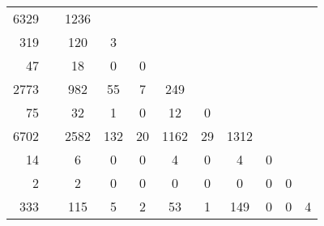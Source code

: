 \documentclass[11pt]{article}
\begin{document}
\begin{tabular}{rcccccccccc}
\cline{3-3}
6329 &  &  
\multicolumn{1}{|c|}{1236}  \\
\cline{3-4}
319 &  &  
\multicolumn{1}{|c|}{120} & 
\multicolumn{1}{|c|}{3}  \\
\cline{3-5}
47 &  &  
\multicolumn{1}{|c|}{18} & 
\multicolumn{1}{|c|}{0} & 
\multicolumn{1}{|c|}{0}  \\
\cline{3-6}
2773 &  &  
\multicolumn{1}{|c|}{982} & 
\multicolumn{1}{|c|}{55} & 
\multicolumn{1}{|c|}{7} & 
\multicolumn{1}{|c|}{249}  \\
\cline{3-7}
75 &  &  
\multicolumn{1}{|c|}{32} & 
\multicolumn{1}{|c|}{1} & 
\multicolumn{1}{|c|}{0} & 
\multicolumn{1}{|c|}{12} & 
\multicolumn{1}{|c|}{0}  \\
\cline{3-8}
6702 &  &  
\multicolumn{1}{|c|}{2582} & 
\multicolumn{1}{|c|}{132} & 
\multicolumn{1}{|c|}{20} & 
\multicolumn{1}{|c|}{1162} & 
\multicolumn{1}{|c|}{29} & 
\multicolumn{1}{|c|}{1312}  \\
\cline{3-9}
14 &  &  
\multicolumn{1}{|c|}{6} & 
\multicolumn{1}{|c|}{0} & 
\multicolumn{1}{|c|}{0} & 
\multicolumn{1}{|c|}{4} & 
\multicolumn{1}{|c|}{0} & 
\multicolumn{1}{|c|}{4} & 
\multicolumn{1}{|c|}{0}  \\
\cline{3-10}
2 &  &  
\multicolumn{1}{|c|}{2} & 
\multicolumn{1}{|c|}{0} & 
\multicolumn{1}{|c|}{0} & 
\multicolumn{1}{|c|}{0} & 
\multicolumn{1}{|c|}{0} & 
\multicolumn{1}{|c|}{0} & 
\multicolumn{1}{|c|}{0} & 
\multicolumn{1}{|c|}{0}  \\
\cline{3-11}
333 &  &  
\multicolumn{1}{|c|}{115} & 
\multicolumn{1}{|c|}{5} & 
\multicolumn{1}{|c|}{2} & 
\multicolumn{1}{|c|}{53} & 
\multicolumn{1}{|c|}{1} & 
\multicolumn{1}{|c|}{149} & 
\multicolumn{1}{|c|}{0} & 
\multicolumn{1}{|c|}{0} & 
\multicolumn{1}{|c|}{4}  \\
\cline{3-11}
\end{tabular}


 
\end{document}
